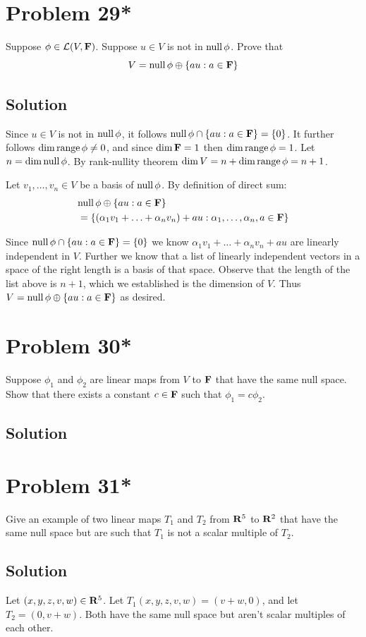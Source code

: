\documentclass{article}
\begin{document}
\section*{Problem 29*}
Suppose $\phi\in\L(V,\F)$. Suppose $u\in V$ is not in $\text{null}\, \phi$. Prove that
\[V=\text{null}\,\phi\oplus\{au:a\in\mathbf{F}\}\]

\subsection*{Solution}
Since $u\in V$  is not in $\text{null}\,\phi$, it follows $\text{null}\,\phi\cap\{au:a\in\mathbf{F}\}=\{0\}$. It further follows $\dim\text{range}\,\phi\neq 0$, and since $\dim \mathbf{F}=1$ then $\dim\text{range}\,\phi=1$. Let $n=\dim\text{null}\,\phi$. By rank-nullity theorem $\dim V=n+\dim\text{range}\,\phi=n + 1$.

\vs

Let $v_1,\ldots,v_n\in V$ be a basis of $\text{null}\,\phi$. By definition of direct sum:
\begin{align*}
&\text{null}\,\phi\oplus\{au:a\in\mathbf{F}\}\\
&=\{(\alpha_1 v_1+\ldots+\alpha_n v_n)+au: \alpha_1,\ldots,\alpha_n,a\in\mathbf{F}\}
\end{align*}

Since $\text{null}\,\phi\cap\{au:a\in\mathbf{F}\}=\{0\}$ we know $\alpha_1 v_1+\ldots+\alpha_n v_n+au$ are linearly independent in $V$. Further we know that a list of linearly independent vectors in a space of the right length is a basis of that space. Observe that the length of the list above is $n+1$, which we established is the dimension of $V$. Thus $V=\text{null}\,\phi\oplus\{au:a\in\mathbf{F}\}$ as desired.

\section*{Problem 30*}
Suppose $\phi_1$ and $\phi_2$ are linear maps from $V$ to $\mathbf{F}$ that have the same null space. Show that there exists a constant $c\in\mathbf{F}$ such that $\phi_1=c\phi_2$.

\subsection*{Solution}


\section*{Problem 31*}
Give an example of two linear maps $T_1$ and $T_2$ from $\mathbf{R}^5$ to $\mathbf{R}^2$ that have the same null space but are such that $T_1$ is not a scalar multiple of $T_2$.

\subsection*{Solution}

Let $(x, y, z, v, w)\in\mathbf{R}^5$. Let $T_1(x, y, z, v, w)=(v+w,0)$, and let $T_2=(0, v+w)$. Both have the same null space but aren't scalar multiples of each other.
\end{document}

